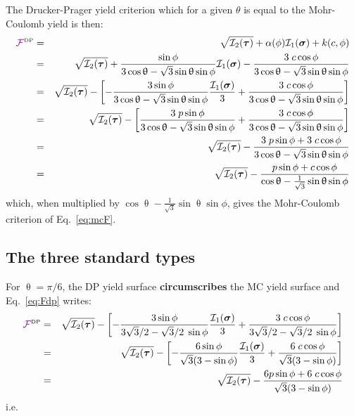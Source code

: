 The Drucker-Prager yield criterion which for a given $\theta$ is equal to the Mohr-Coulomb yield is then:
\begin{eqnarray}
{\color{violet}\cal F}^{\text{\tiny DP}}
&=& \sqrt{{\cal I}_2({\bm \tau})} + \alpha(\phi) {\cal I}_1({\bm \sigma}) + k(c,\phi)  \nonumber\\
&=& \sqrt{{\cal I}_2({\bm \tau})} 
+ \frac{\sin\phi}{ 3 \cos\uptheta - \sqrt{3}\sin\uptheta \sin\phi}  {\cal I}_1({\bm \sigma})  
- \frac{ 3\; c \cos \phi }{ 3 \cos\uptheta - \sqrt{3}\sin\uptheta \sin\phi} \nonumber\\
&=& \sqrt{{\cal I}_2({\bm \tau})} 
- \left[ -\frac{3 \sin\phi}{ 3 \cos\uptheta - \sqrt{3}\sin\uptheta \sin\phi}  \frac{{\cal I}_1({\bm \sigma})}{3}
+ \frac{ 3\; c \cos \phi }{ 3 \cos\uptheta - \sqrt{3}\sin\uptheta \sin\phi} \right] \label{eq:Fdp}\\
&=& \sqrt{{\cal I}_2({\bm \tau})} 
- \left[ \frac{3\; p \sin\phi}{ 3 \cos\uptheta - \sqrt{3}\sin\uptheta \sin\phi} 
+ \frac{ 3\; c \cos \phi }{ 3 \cos\uptheta - \sqrt{3}\sin\uptheta \sin\phi} \right] \nonumber\\
&=& \sqrt{{\cal I}_2({\bm \tau})}  
- \frac{3\; p \sin\phi  + 3\; c \cos \phi }{ 3 \cos\uptheta - \sqrt{3}\sin\uptheta \sin\phi} \nonumber\\ 
&=& \sqrt{{\cal I}_2({\bm \tau})}  
- \frac{p \sin\phi  + c \cos \phi }{  \cos\uptheta - \frac{1}{\sqrt{3}}\sin\uptheta \sin\phi} 
\end{eqnarray}
which, when multiplied by $\cos\uptheta - \frac{1}{\sqrt{3}}\sin\uptheta \sin\phi$, gives
the Mohr-Coulomb criterion of Eq.~\eqref{eq:mcF}. 

\subsection{The three standard types}

For $\uptheta=\pi/6$, the DP yield surface {\bf circumscribes} the MC yield 
surface and Eq.~\eqref{eq:Fdp} writes:
\begin{eqnarray}
{\color{violet}\cal F}^{\text{\tiny DP}}
&=& \sqrt{{\cal I}_2({\bm \tau})} 
- \left[ -\frac{3 \sin\phi}{ 3 \sqrt{3}/2 - \sqrt{3}/2 \; \sin\phi}  \frac{{\cal I}_1({\bm \sigma})}{3}
+ \frac{ 3\; c \cos \phi }{ 3 \sqrt{3}/2 - \sqrt{3}/2 \; \sin\phi} \right] \nonumber\\
&=& \sqrt{{\cal I}_2({\bm \tau})} 
- \left[ -\frac{6 \sin\phi}{\sqrt{3} (3 - \sin\phi) }  \frac{{\cal I}_1({\bm \sigma})}{3}
+ \frac{ 6\; c \cos \phi }{ \sqrt{3}(3 - \sin\phi)} \right] \nonumber\\
&=& \sqrt{{\cal I}_2({\bm \tau})} 
- \frac{ 6 p \sin \phi + 6\; c \cos \phi }{ \sqrt{3}(3 - \sin\phi)} \label{eq:dpc}
\end{eqnarray}
i.e.

